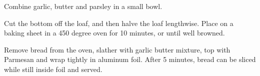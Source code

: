 \begin{recipe}

Combine garlic, butter and parsley in a small bowl.


Cut the bottom off the loaf, and then halve the loaf lengthwise. Place on a baking sheet in a 450 degree oven for 10 minutes, or until well browned.


Remove bread from the oven, slather with garlic butter mixture, top with Parmesan and wrap tightly in aluminum foil.
After 5 minutes, bread can be sliced while still inside foil and served.

\end{recipe}

